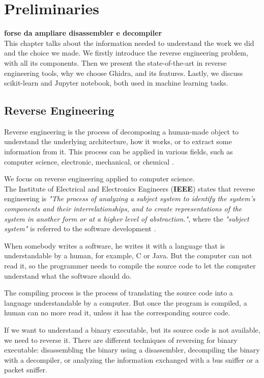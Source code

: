 \chapter{Preliminaries}
\textbf{forse da ampliare disassembler e decompiler}\\
This chapter talks about the information needed to understand the work we did and the choice we made. We firstly introduce the reverse engineering problem, with all its components. Then we present the state-of-the-art in reverse engineering tools, why we choose Ghidra, and its features. Lastly, we discuss scikit-learn and Jupyter notebook, both used in machine learning tasks.

\section{Reverse Engineering}

Reverse engineering is the process of decomposing a human-made object to understand the underlying architecture, how it works, or to extract some information from it. This process can be applied in various fields, such as computer science, electronic, mechanical, or chemical \cite{eilam2011reversing}.

We focus on reverse engineering applied to computer science. 
\\

The Institute of Electrical and Electronics Engineers (\textbf{IEEE}) states that reverse engineering is \textit{"The process of analyzing a subject system to identify the system's components and their interrelationships, and to create representations of the system in another form or at a higher level of abstraction."}, where the \textit{"subject system"} is referred to the software development \cite{chikofsky1990reverse}. 

When somebody writes a software, he writes it with a language that is understandable by a human, for example, C or Java.  But the computer can not read it, so the programmer needs to compile the source code to let the computer understand what the software should do. 

The compiling process is the process of translating the source code into a language understandable by a computer. But once the program is compiled, a human can no more read it, unless it has the corresponding source code. 

If we want to understand a binary executable, but its source code is not available, we need to reverse it. There are different techniques of reversing for binary executable: disassembling the binary using a disassembler, decompiling the binary with a decompiler, or analyzing the information exchanged with a bus sniffer or a packet sniffer.


